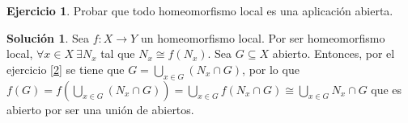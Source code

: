 \documentclass{article}
\theoremstyle{plain}
\theoremstyle{definition}
\newtheorem{exercise}{Ejercicio}
\newtheorem*{sol*}{Solución}
\begin{document}
\begin{exercise}
Probar que todo homeomorfismo local es una aplicación abierta.
\end{exercise}

\begin{sol*}
Sea $f:X\to Y$ un homeomorfismo local. Por ser homeomorfismo local, $\forall x\in X\ \exists N_x$ tal que $N_x\cong f(N_x)$. Sea $G\subseteq X$ abierto. Entonces, por el ejercicio \ref{2} se tiene que $G=\bigcup_{x\in G} (N_x\cap G)$, por lo que $f(G)=f(\bigcup_{x\in G} (N_x\cap G))=\bigcup_{x\in G}f(N_x\cap G)\cong \bigcup_{x\in G} N_x\cap G$ que es abierto por ser una unión de abiertos.
\end{sol*}
\end{document}
